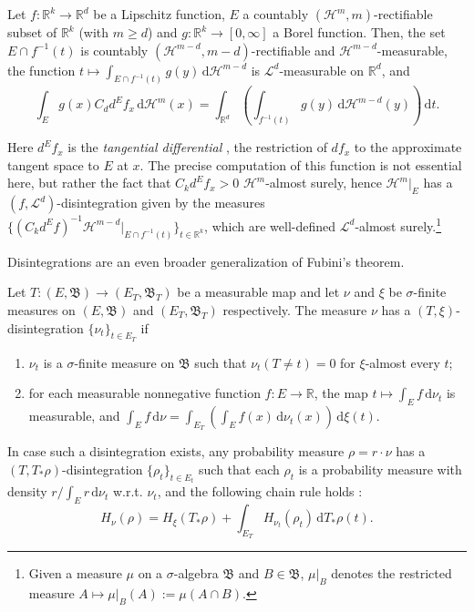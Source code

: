\documentclass[runningheads]{llncs}
\newcommand{\salg}[1]{\mathfrak {#1}}
\def \d{\mbox{\(\,\mathrm{d}\)}}
\newcommand{\Rr}{\mathbb{R}}
\newcommand{\ent}[1]{H_{#1}}
\begin{document}
\begin{proposition}
    Let $f:\Rr^k\to \Rr^d$ be a Lipschitz function, $E$  a countably $(\mathcal H^m,m)$-rectifiable subset of $\Rr^k$ (with $m\geq d$) and $g:\Rr^k\to [0,\infty]$ a Borel function. Then, the set $E\cap f^{-1}(t)$ is countably $(\mathcal H^{m-d},m-d)$-rectifiable and $\mathcal H^{m-d}$-measurable, the function $t\mapsto \int_{E\cap f^{-1}(t)} g(y) \d\mathcal H^{m-d}$ is $\mathcal L^d$-measurable on $\Rr^d$, and
    \begin{equation}\label{eq:coarea}
        \int_E g(x) C_d d^E f_x \d\mathcal H^m(x) = \int_{\Rr^d} \left(\int_{f^{-1}(t)} g(y) \d\mathcal H^{m-d}(y) \right) \d t.
    \end{equation}
\end{proposition}
Here $d^E f_x $ is the \emph{tangential differential} \cite[Def. 2.89]{Ambrosio2000}, the restriction of $df_x$ to the approximate tangent space to $E$ at $x$. The precise computation of this function is not essential here, but rather the fact that  $C_k d^E f_x >0$ $\mathcal H^m$-almost surely, hence $\mathcal H^{m}|_{ E}$ has a $(f,\mathcal L^d)$-disintegration given by the measures\\ $\{(C_k d^E f)^{-1} \mathcal H^{m-d}|_{ E \cap f^{-1}(t)}\}_{t\in \Rr^k}$, which are well-defined $\mathcal L^d$-almost surely.\footnote{Given a measure $\mu$ on a $\sigma$-algebra $\salg B$ and $B\in \salg B$, $\mu|_B$ denotes the restricted measure $A\mapsto \mu|_B(A) := \mu(A\cap B)$.}

\begin{remark}[On disintegrations]\label{rmk:disintegrations} Disintegrations are an even broader generalization of Fubini's theorem. 

Let $T:(E,\salg B)\to (E_T,\salg B_T)$ be a measurable map and let $\nu$ and $\xi$ be  $\sigma$-finite measures on $(E,\salg B)$ and $(E_T,\salg B_T)$ respectively. The measure $\nu$ has a $(T,\xi)$-disintegration $\{\nu_t\}_{t\in E_T}$ if
\begin{enumerate}
\item $\nu_t$ is a $\sigma$-finite measure on $\salg{B}$ such that $\nu_t(T\neq t)=0$ for $\xi$-almost every $t$;
\item for each measurable nonnegative function $f:E\to \Rr$, the map $t\mapsto \int_E f \d \nu_t$ is measurable, and $\int_E f\d \nu= \int_{E_T} \left(\int_E  f(x) \d\nu_t(x) \right)\d \xi(t)$.
\end{enumerate}
In case such a disintegration exists,  any probability measure $\rho = r \cdot \nu$ has a $(T,T_*\rho)$-disintegration $\{ \rho_t\}_{t\in E_t}$ such that each $\rho_t$ is a probability measure with density $r/\int_{E} r \d \nu_t $ w.r.t. $\nu_t$, and the following chain rule holds \cite[Prop. 3]{Vigneaux-GSI21-disintegrations}:
 \begin{equation}\label{eq:generalized_chain_rule}
 \ent{\nu}(\rho) =  \ent{\xi}(T_*\rho) +  \int_{E_T} \ent{\nu_t}(\rho_t)\d T_*\rho(t).
 \end{equation}
\end{remark}
\end{document}
